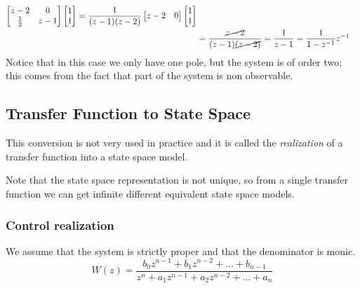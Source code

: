 \begin{example}
\begin{align*}
\begin{bmatrix}
    z-2 & 0\\
    \frac{1}{2} & z-1\\
\end{bmatrix}
\begin{bmatrix}
    1\\
    1\\
\end{bmatrix}
=
\frac{1}{(z-1)(z-2)}
\begin{bmatrix}
    z-2 & 0\\
\end{bmatrix}
\begin{bmatrix}
    1\\
    1\\
\end{bmatrix}\\
&=
\frac{\cancel{z-2}}{(z-1)\cancel{(z-2)}} = \frac{1}{z-1} = \frac{1}{1-z^{-1}} z^{-1}
\end{align*}
Notice that in this case we only have one pole, but the system is of order two; this comes from the fact that part of the system is non observable.

\end{example}

\subsection{Transfer Function to State Space}
This conversion is not very used in practice and it is called the \emph{realization} of a transfer function into a state space model.

Note that the state space representation is not unique, so from a single transfer function we can get infinite different equivalent state space models.

\subsubsection{Control realization}

We assume that the system is strictly proper and that the denominator is monic.
\[ W(z) = \frac{b_0 z^{n-1} + b_1 z^{n-2} + \dots + b_{n-1}}{z^n + a_1 z^{n-1} + a_2 z^{n-2} + \dots + a_n} \]

